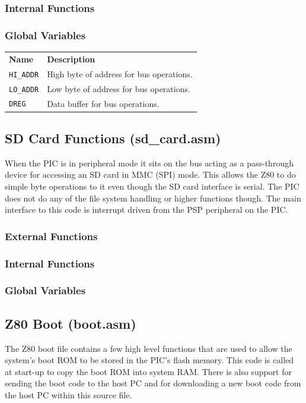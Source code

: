 \documentclass[a4paper,10pt]{book}
\begin{document}
\subsubsection{Internal Functions}

\subsubsection{Global Variables}
\begin{tabular}{lp{8cm}}
 \textbf{Name}&\textbf{Description}\\
 \texttt{HI\_ADDR}&High byte of address for bus operations.\\
 \texttt{LO\_ADDR}&Low byte of address for bus operations.\\
 \texttt{DREG}&Data buffer for bus operations.\\
\end{tabular}


\subsection{SD Card Functions (sd\_card.asm)}
When the PIC is in peripheral mode it sits on the bus acting as a pass-through device for accessing an SD card in MMC (SPI) mode.  This allows the Z80 to do simple byte operations to it even though the SD card interface is serial.  The PIC does not do any of the file system handling or higher functions though.  The main interface to this code is interrupt driven from the PSP peripheral on the PIC.

\subsubsection{External Functions}

\subsubsection{Internal Functions}

\subsubsection{Global Variables}

\subsection{Z80 Boot (boot.asm)}
The Z80 boot file contains a few high level functions that are used to allow the system's boot ROM to be stored in the PIC's flash memory.  This code is called at start-up to copy the boot ROM into system RAM.  There is also support for sending the boot code to the host PC and for downloading a new boot code from the host PC within this source file.
\end{document}
